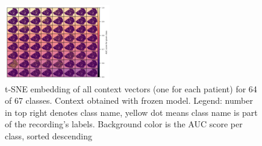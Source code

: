 \begin{figure}[H]\centering
	\includegraphics[height=\linewidth, angle=90]{bilder/tsne-context-all(ordered by auc)new.png}
	\caption[Two dimensional t-SNE embeddings of all context vectors (different model)]{t-SNE embedding of all context vectors (one for each patient) for 64 of 67 classes. Context obtained with frozen model. Legend: number in top right denotes class name, yellow dot means class name is part of the recording's labels. Background color is the AUC score per class, sorted descending}
	\label{plot:tsne-context-all-frozen}
\end{figure}
